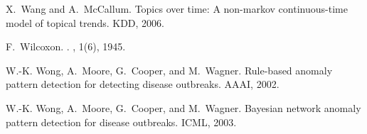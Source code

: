 \documentclass[twoside,leqno,twocolumn]{article}
\begin{document}
\begin{thebibliography}{10}
X.~Wang and A.~McCallum.
\newblock Topics over time: A non-markov continuous-time model of topical
  trends.
\newblock KDD, 2006.

F.~Wilcoxon.
.
, 1(6), 1945.

W.-K. Wong, A.~Moore, G.~Cooper, and M.~Wagner.
\newblock Rule-based anomaly pattern detection for detecting disease outbreaks.
\newblock AAAI, 2002.

W.-K. Wong, A.~Moore, G.~Cooper, and M.~Wagner.
\newblock Bayesian network anomaly pattern detection for disease outbreaks.
\newblock ICML, 2003.

\end{thebibliography}
\end{document}
